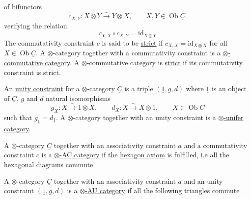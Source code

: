 of bifunctors
\[
c_{X,Y}:X\otimes Y\xrightarrow{\sim}Y\otimes X,\qquad X,Y\in\operatorname{Ob}\underline{C}.
\]
verifying the relation
\[
c_{Y,X}\circ c_{X,Y}=\mathrm{id}_{X\otimes Y}
\]
The commutativity constraint $c$ is said to be \uline{strict} if $c_{X,X}=\mathrm{id}_{X\otimes X}$ for all $X\in\operatorname{Ob}\underline{C}$. A $\otimes$-category together with a commutativity constraint is a \uline{$\otimes$-commutative category}. A $\otimes$-commutative category is \uline{strict} if its commutativity constraint is strict.

An \uline{unity constraint} for a $\otimes$-category $\underline{C}$ is a triple $(\underline{1},g,d)$ where $\underline{1}$ is an object of $\underline{C}$, $g$ and $d$ natural isomorphisms
\[
g_X:X\xrightarrow{\sim}\underline{1}\otimes X,\qquad
d_X:X\xrightarrow{\sim}X\otimes\underline{1},\qquad X\in\operatorname{Ob}\underline{C}
\]
such that $g_{\underline{1}}=d_{\underline{1}}$. A $\otimes$-category together with an unity constraint is a \uline{$\otimes$-unifer category}.

A $\otimes$-category $\underline{C}$ together with an associativity constraint $a$ and a commutativity constraint $c$ is a \uline{$\otimes$-AC category} if the \uline{hexagon axiom} is fulfilled, i.e all the hexagonal diagrams commute

A $\otimes$-category $\underline{C}$ together with an associativity constraint $a$ and an unity constraint $(\underline{1},g,d)$ is a \uline{$\otimes$-AU category} if all the following triangles commute
